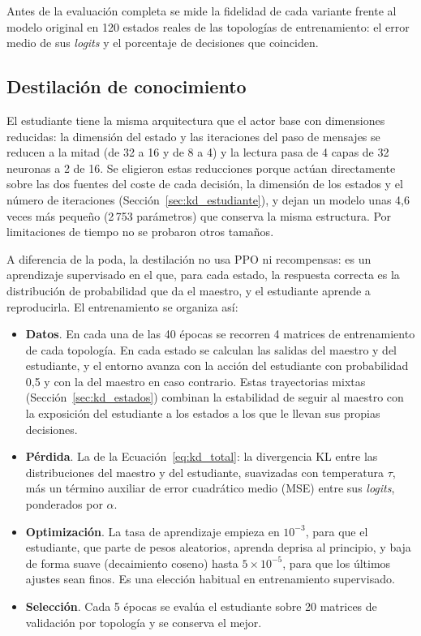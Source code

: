 Antes de la evaluación completa se mide la fidelidad de cada variante frente al modelo original en 120 estados reales de las topologías de entrenamiento: el error medio de sus \textit{logits} y el porcentaje de decisiones que coinciden.

\subsection{Destilación de conocimiento}\label{sec:flujo_destilacion}

El estudiante tiene la misma arquitectura que el actor base con dimensiones reducidas: la dimensión del estado y las iteraciones del paso de mensajes se reducen a la mitad (de 32 a 16 y de 8 a 4) y la lectura pasa de 4 capas de 32 neuronas a 2 de 16. Se eligieron estas reducciones porque actúan directamente sobre las dos fuentes del coste de cada decisión, la dimensión de los estados y el número de iteraciones (Sección~\ref{sec:kd_estudiante}), y dejan un modelo unas 4,6 veces más pequeño (2\,753 parámetros) que conserva la misma estructura. Por limitaciones de tiempo no se probaron otros tamaños.

A diferencia de la poda, la destilación no usa PPO ni recompensas: es un aprendizaje supervisado en el que, para cada estado, la respuesta correcta es la distribución de probabilidad que da el maestro, y el estudiante aprende a reproducirla. El entrenamiento se organiza así:
\begin{itemize}
	\item \textbf{Datos}. En cada una de las 40 épocas se recorren 4 matrices de entrenamiento de cada topología. En cada estado se calculan las salidas del maestro y del estudiante, y el entorno avanza con la acción del estudiante con probabilidad 0,5 y con la del maestro en caso contrario. Estas trayectorias mixtas (Sección~\ref{sec:kd_estados}) combinan la estabilidad de seguir al maestro con la exposición del estudiante a los estados a los que le llevan sus propias decisiones.
	\item \textbf{Pérdida}. La de la Ecuación~\eqref{eq:kd_total}: la divergencia KL entre las distribuciones del maestro y del estudiante, suavizadas con temperatura $\tau$, más un término auxiliar de error cuadrático medio (MSE) entre sus \textit{logits}, ponderados por $\alpha$.
	\item \textbf{Optimización}. La tasa de aprendizaje empieza en $10^{-3}$, para que el estudiante, que parte de pesos aleatorios, aprenda deprisa al principio, y baja de forma suave (decaimiento coseno) hasta $5\times10^{-5}$, para que los últimos ajustes sean finos. Es una elección habitual en entrenamiento supervisado.
	\item \textbf{Selección}. Cada 5 épocas se evalúa el estudiante sobre 20 matrices de validación por topología y se conserva el mejor.
\end{itemize}

